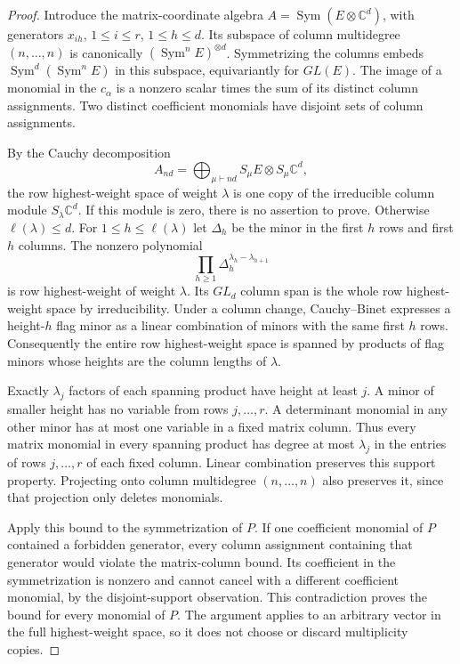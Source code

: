 \begin{proof}
Introduce the matrix-coordinate algebra
$A=\operatorname{Sym}(E\otimes\mathbb C^d)$, with generators $x_{ih}$,
$1\leq i\leq r$, $1\leq h\leq d$. Its subspace of column multidegree
$(n,\ldots,n)$ is canonically $(\operatorname{Sym}^nE)^{\otimes d}$.
Symmetrizing the columns embeds $\operatorname{Sym}^d(\operatorname{Sym}^nE)$
in this subspace, equivariantly for $GL(E)$. The image of a monomial in
the $c_\alpha$ is a nonzero scalar times the sum of its distinct column
assignments. Two distinct coefficient monomials have disjoint sets of
column assignments.

By the Cauchy decomposition
\[
 A_{nd}=\bigoplus_{\mu\vdash nd}S_\mu E\otimes S_\mu\mathbb C^d,
\]
the row highest-weight space of weight $\lambda$ is one copy of the
irreducible column module $S_\lambda\mathbb C^d$. If this module is zero,
there is no assertion to prove. Otherwise $\ell(\lambda)\leq d$.
For $1\leq h\leq\ell(\lambda)$ let $\Delta_h$ be the minor in the
first $h$ rows and first $h$ columns. The nonzero polynomial
\[
                 \prod_{h\geq1}\Delta_h^{\lambda_h-\lambda_{h+1}}
\]
is row highest-weight of weight $\lambda$. Its $GL_d$ column span is the
whole row highest-weight space by irreducibility. Under a column change,
Cauchy--Binet expresses a height-$h$ flag minor as a linear combination
of minors with the same first $h$ rows. Consequently the entire row
highest-weight space is spanned by products of flag minors whose heights
are the column lengths of $\lambda$.

Exactly $\lambda_j$ factors of each spanning product have height at
least $j$. A minor of smaller height has no variable from rows
$j,\ldots,r$. A determinant monomial in any other minor has at most one
variable in a fixed matrix column. Thus every matrix monomial in every
spanning product has degree at most $\lambda_j$ in the entries of rows
$j,\ldots,r$ of each fixed column. Linear combination preserves this
support property. Projecting onto column multidegree $(n,\ldots,n)$ also
preserves it, since that projection only deletes monomials.

Apply this bound to the symmetrization of $P$. If one coefficient
monomial of $P$ contained a forbidden generator, every column assignment
containing that generator would violate the matrix-column bound. Its
coefficient in the symmetrization is nonzero and cannot cancel with a
different coefficient monomial, by the disjoint-support observation.
This contradiction proves the bound for every monomial of $P$.
The argument applies to an arbitrary vector in the full highest-weight
space, so it does not choose or discard multiplicity copies.
\end{proof}

